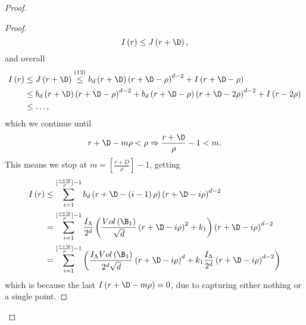 \begin{proof}
\begin{proof}
    \[
        I\left(r\right)\leq J\left(r+\D\right),
    \]
    and overall
    \begin{align*}
        I\left(r\right) &\leq J\left(r+\D\right) \overset{\left(13\right)}{\leq} b_d\left(r+\D\right)\left(r+\D-\rho\right)^{d-2} + I\left(r+\D-\rho\right)\\
        &\leq b_d\left(r+\D\right)\left(r+\D-\rho\right)^{d-2} + b_d\left(r+\D-\rho\right)\left(r+\D-2\rho\right)^{d-2} + I\left(r-2\rho\right) \\
        &\leq \dots,
    \end{align*}
    which we continue until
    \[
        r+\D-m\rho < \rho \Rightarrow \frac{r+\D}{\rho} - 1 < m.
    \]
    This means we stop at \(m=[\frac{r+D}{\rho}]-1\), getting
    \begin{align*}
        I\left(r\right) &\leq \sum_{i=1}^{[\frac{r+\D}{\rho}]-1} b_d\left(r+\D-\left(i-1\right)\rho\right)\left(r+\D-i\rho\right)^{d-2}\\
        &= \sum_{i=1}^{[\frac{r+\D}{\rho}]-1} \frac{I_\Lambda}{2^d}\left(\frac{Vol\left(\B_1\right)}{\sqrt{d}}\left(r+\D-i\rho\right)^2 + k_1\right)\left(r+\D-i\rho\right)^{d-2}\\
        &=\sum_{i=1}^{[\frac{r+\D}{\rho}]-1} \left(\frac{I_\Lambda Vol\left(\B_1\right)}{2^d\sqrt{d}}\left(r+\D-i\rho\right)^d+k_1\frac{I_\Lambda}{2^d}\left(r+\D-i\rho\right)^{d-2}\right)\\
    \end{align*}
    which is because the last $I\left(r+\D-m\rho\right)=0$, due to capturing either nothing or a single point. 
    

\end{proof}
\end{proof}
